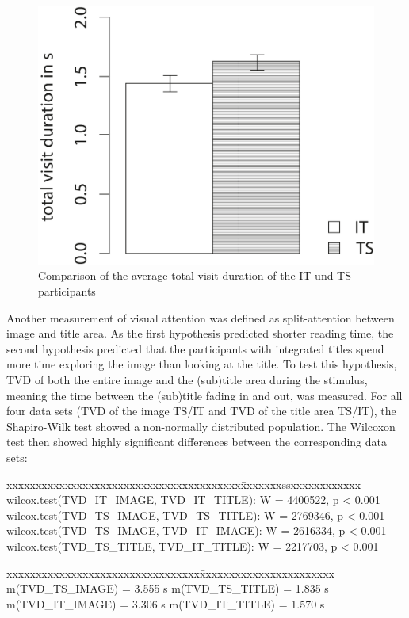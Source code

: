 \documentclass[output=paper]{langsci/langscibook}
\begin{document}
\begin{figure} 
  \includegraphics[height=.3\textheight]{figures/Fox6.pdf}
  \caption{Comparison of the average total visit duration of the IT und TS participants}
  \label{fox:fig:6}
\end{figure}


Another measurement of visual attention was defined as split-attention between image and title area. As the first hypothesis predicted shorter reading time, the second hypothesis predicted that the participants with integrated titles spend more time exploring the image than looking at the title. To test this hypothesis, TVD of both the entire image and the (sub)title area during the stimulus, meaning the time between the (sub)title fading in and out, was measured. For all four data sets (TVD of the image TS/IT and TVD of the title area TS/IT), the Shapiro-Wilk test showed a non-normally distributed population. The Wilcoxon test then showed highly significant differences between the corresponding data sets:


\ea
\begin{tabbing}
xxxxxxxxxxxxxxxxxxxxxxxxxxxxxxxxxxxxxxxx\=xxxxxxxssxxxxxxxxxxxx\kill
wilcox.test(TVD\_IT\_IMAGE, TVD\_IT\_TITLE): \>		W = 4400522, p < 0.001\\
wilcox.test(TVD\_TS\_IMAGE, TVD\_TS\_TITLE): \>		W = 2769346, p < 0.001\\
wilcox.test(TVD\_TS\_IMAGE, TVD\_IT\_IMAGE): \>		W = 2616334, p < 0.001\\
wilcox.test(TVD\_TS\_TITLE, TVD\_IT\_TITLE): \>		W = 2217703, p < 0.001
\end{tabbing}
\begin{tabbing}
xxxxxxxxxxxxxxxxxxxxxxxxxxxxxxxxx\=xxxxxxxxxxxxxxxxxxxxxxx\kill
m(TVD\_TS\_IMAGE) = 3.555 s	\>	m(TVD\_TS\_TITLE) = 1.835 s\\
m(TVD\_IT\_IMAGE) = 3.306 s	\>	m(TVD\_IT\_TITLE) = 1.570 s
\end{tabbing}
\z
\end{document}
